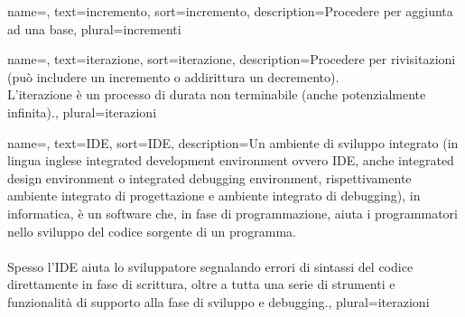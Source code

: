 
\renewcommand{\acronymname}{Acronimi e abbreviazioni}




{
    name=,
    text=incremento,
    sort=incremento,
    description={Procedere per aggiunta ad una base},
    plural=incrementi
}

{
    name=,
    text=iterazione,
    sort=iterazione,
    description={Procedere per rivisitazioni (può includere un incremento o addirittura un decremento).\\L'iterazione è un processo di durata non terminabile (anche potenzialmente infinita).},
    plural=iterazioni
}

{
	name=,
	text=IDE,
	sort=IDE,
	description={Un ambiente di sviluppo integrato (in lingua inglese integrated development environment ovvero IDE, anche integrated design environment o integrated debugging environment, rispettivamente ambiente integrato di progettazione e ambiente integrato di debugging), in informatica, è un software che, in fase di programmazione, aiuta i programmatori nello sviluppo del codice sorgente di un programma.\\ \\
	Spesso l'IDE aiuta lo sviluppatore segnalando errori di sintassi del codice direttamente in fase di scrittura, oltre a tutta una serie di strumenti e funzionalità di supporto alla fase di sviluppo e debugging.},
	plural=iterazioni
}